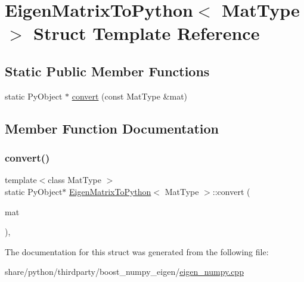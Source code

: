 \hypertarget{structEigenMatrixToPython}{}\section{Eigen\+Matrix\+To\+Python$<$ Mat\+Type $>$ Struct Template Reference}
\label{structEigenMatrixToPython}
\subsection*{Static Public Member Functions}
\begin{DoxyCompactItemize}
\item 
static Py\+Object $\ast$ \hyperlink{structEigenMatrixToPython_a4ad0b461a3c48412f6c23eba29bc2895}{convert} (const Mat\+Type \&mat)
\end{DoxyCompactItemize}


\subsection{Member Function Documentation}
\mbox{\label{structEigenMatrixToPython_a4ad0b461a3c48412f6c23eba29bc2895}} 
\subsubsection{\texorpdfstring{convert()}{convert()}}
{\footnotesize\ttfamily template$<$class Mat\+Type $>$ \\
static Py\+Object$\ast$ \hyperlink{structEigenMatrixToPython}{Eigen\+Matrix\+To\+Python}$<$ Mat\+Type $>$\+::convert (\begin{DoxyParamCaption}\item[{const Mat\+Type \&}]{mat }\end{DoxyParamCaption})\hspace{0.3cm}{\ttfamily [inline]}, {\ttfamily [static]}}



The documentation for this struct was generated from the following file\+:\begin{DoxyCompactItemize}
\item 
share/python/thirdparty/boost\+\_\+numpy\+\_\+eigen/\hyperlink{eigen__numpy_8cpp}{eigen\+\_\+numpy.\+cpp}\end{DoxyCompactItemize}
